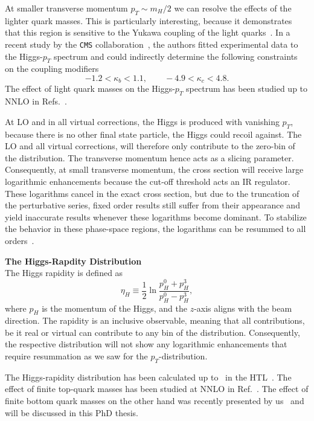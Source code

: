 At smaller transverse momentum $p_T \sim m_H/2$ we can resolve the effects of the lighter quark masses. This is particularly interesting, because it demonstrates that this region is sensitive to the Yukawa coupling of the light quarks~\cite{Bishara:2016jga, Bonner:2016sdg}. In a recent study by the \texttt{CMS} collaboration~\cite{CMS:2018gwt}, the authors fitted experimental data to the Higgs-$p_T$ spectrum and could indirectly determine the following constraints on the coupling modifiers
\begin{equation}
-1.2 < \kappa_b < 1.1, \qquad -4.9 < \kappa_c < 4.8.
\end{equation}
The effect of light quark masses on the Higgs-$p_T$ spectrum has been studied up to \acs{NNLO} in Refs.~\cite{Lindert:2017pky, Caola:2018zye, Bonciani:2022jmb,Czakon:2024ywb}.

At \acs{LO} and in all virtual corrections, the Higgs is produced with vanishing $p_T$, because there is no other final state particle, the Higgs could recoil against. The \acs{LO} and all virtual corrections, will therefore only contribute to the zero-bin of the distribution. The transverse momentum hence acts as a slicing parameter. Consequently, at small transverse momentum, the cross section will receive large logarithmic enhancements because the cut-off threshold acts an \acs{IR} regulator. These logarithms cancel in the exact cross section, but due to the truncation of the perturbative series, fixed order results still suffer from their appearance and yield inaccurate results whenever these logarithms become dominant. To stabilize the behavior in these phase-space regions, the logarithms can be resummed to all orders~\cite{Mantler:2012bj,Grazzini:2013mca, Hamilton:2015nsa, Bagnaschi:2015qta, Bagnaschi:2015bop, Frederix:2016cnl, Caola:2016upw, Niggetiedt:2024nmp}.

\textbf{The Higgs-Rapdity Distribution} \\
The Higgs rapidity is defined as
\begin{equation}
\eta_H \equiv \frac{1}{2} \ln \frac{p^0_H + p^3_H}{p^0_H - p^3_H},
\end{equation}
where $p_H$ is the momentum of the Higgs, and the $z$-axis aligns with the beam direction. The rapidity is an inclusive observable, meaning that all contributions, be it real or virtual can contribute to any bin of the distribution. Consequently, the respective distribution will not show any logarithmic enhancements that require resummation as we saw for the $p_T$-distribution.

The Higgs-rapidity distribution has been calculated up to \NNNLO\ in the \acs{HTL}~\cite{Dulat:2018bfe, Dulat:2017prg}. The effect of finite top-quark masses has been studied at \acs{NNLO} in Ref.~\cite{Niggetiedt:2024nmp}. The effect of finite bottom quark masses on the other hand was recently presented by us~\cite{Czakon:2024ywb} and will be discussed in this PhD thesis.